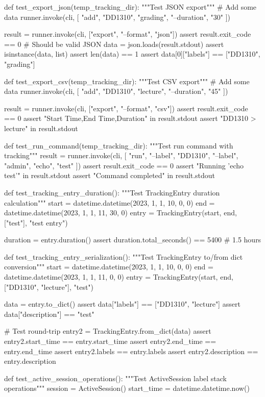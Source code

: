 def test_export_json(temp_tracking_dir):
    """Test JSON export"""
    # Add some data
    runner.invoke(cli, [
        "add", "DD1310", "grading", 
        "--duration", "30"
    ])
    
    result = runner.invoke(cli, ["export", "--format", "json"])
    assert result.exit_code == 0
    # Should be valid JSON
    data = json.loads(result.stdout)
    assert isinstance(data, list)
    assert len(data) == 1
    assert data[0]["labels"] == ["DD1310", "grading"]

def test_export_csv(temp_tracking_dir):
    """Test CSV export"""
    # Add some data
    runner.invoke(cli, [
        "add", "DD1310", "lecture",
        "--duration", "45"
    ])
    
    result = runner.invoke(cli, ["export", "--format", "csv"])
    assert result.exit_code == 0
    assert "Start Time,End Time,Duration" in result.stdout
    assert "DD1310 > lecture" in result.stdout

def test_run_command(temp_tracking_dir):
    """Test run command with tracking"""
    result = runner.invoke(cli, [
        "run", "--label", "DD1310", "--label", "admin",
        "echo", "test"
    ])
    assert result.exit_code == 0
    assert "Running 'echo test'" in result.stdout
    assert "Command completed" in result.stdout

def test_tracking_entry_duration():
    """Test TrackingEntry duration calculation"""
    start = datetime.datetime(2023, 1, 1, 10, 0, 0)
    end = datetime.datetime(2023, 1, 1, 11, 30, 0)
    entry = TrackingEntry(start, end, ["test"], "test entry")
    
    duration = entry.duration()
    assert duration.total_seconds() == 5400  # 1.5 hours

def test_tracking_entry_serialization():
    """Test TrackingEntry to/from dict conversion"""
    start = datetime.datetime(2023, 1, 1, 10, 0, 0)
    end = datetime.datetime(2023, 1, 1, 11, 0, 0)
    entry = TrackingEntry(start, end, ["DD1310", "lecture"], "test")
    
    data = entry.to_dict()
    assert data["labels"] == ["DD1310", "lecture"]
    assert data["description"] == "test"
    
    # Test round-trip
    entry2 = TrackingEntry.from_dict(data)
    assert entry2.start_time == entry.start_time
    assert entry2.end_time == entry.end_time
    assert entry2.labels == entry.labels
    assert entry2.description == entry.description

def test_active_session_operations():
    """Test ActiveSession label stack operations"""
    session = ActiveSession()
    start_time = datetime.datetime.now()
    

